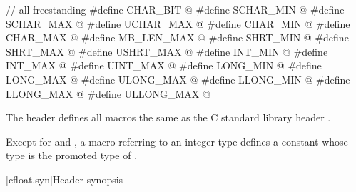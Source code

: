 %
%
%
%
%
%
%
%
%
%
%
%
%
%
%
%
%
%
%
%
\begin{codeblock}
// all freestanding
#define CHAR_BIT @\seebelow@
#define SCHAR_MIN @\seebelow@
#define SCHAR_MAX @\seebelow@
#define UCHAR_MAX @\seebelow@
#define CHAR_MIN @\seebelow@
#define CHAR_MAX @\seebelow@
#define MB_LEN_MAX @\seebelow@
#define SHRT_MIN @\seebelow@
#define SHRT_MAX @\seebelow@
#define USHRT_MAX @\seebelow@
#define INT_MIN @\seebelow@
#define INT_MAX @\seebelow@
#define UINT_MAX @\seebelow@
#define LONG_MIN @\seebelow@
#define LONG_MAX @\seebelow@
#define ULONG_MAX @\seebelow@
#define LLONG_MIN @\seebelow@
#define LLONG_MAX @\seebelow@
#define ULLONG_MAX @\seebelow@
\end{codeblock}

\pnum
The header  defines all macros the same as
the C standard library header .
\begin{note}
Except for  and , a macro referring to
an integer type  defines a constant whose type is the promoted
type of .
\end{note}


[cfloat.syn]{Header  synopsis}

